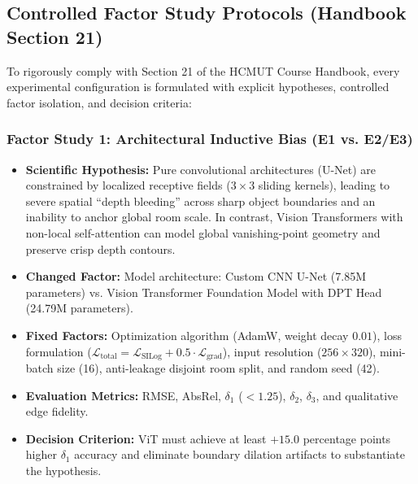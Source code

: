 \documentclass[twoside,final]{hcmut-report}
\begin{document}
\subsection{Controlled Factor Study Protocols (Handbook Section 21)}

To rigorously comply with Section 21 of the HCMUT Course Handbook, every experimental configuration is formulated with explicit hypotheses, controlled factor isolation, and decision criteria:

\subsubsection{Factor Study 1: Architectural Inductive Bias (E1 vs. E2/E3)}

\begin{itemize}[leftmargin=*]

  \item \textbf{Scientific Hypothesis:} Pure convolutional architectures (U-Net) are constrained by localized receptive fields ($3 \times 3$ sliding kernels), leading to severe spatial ``depth bleeding'' across sharp object boundaries and an inability to anchor global room scale. In contrast, Vision Transformers with non-local self-attention can model global vanishing-point geometry and preserve crisp depth contours.

  \item \textbf{Changed Factor:} Model architecture: Custom CNN U-Net (7.85M parameters) vs. Vision Transformer Foundation Model with DPT Head (24.79M parameters).

  \item \textbf{Fixed Factors:} Optimization algorithm (AdamW, weight decay $0.01$), loss formulation ($\mathcal{L}_{\text{total}} = \mathcal{L}_{\text{SILog}} + 0.5 \cdot \mathcal{L}_{\text{grad}}$), input resolution ($256 \times 320$), mini-batch size (16), anti-leakage disjoint room split, and random seed (42).

  \item \textbf{Evaluation Metrics:} RMSE, AbsRel, $\delta_1$ ($< 1.25$), $\delta_2$, $\delta_3$, and qualitative edge fidelity.

  \item \textbf{Decision Criterion:} ViT must achieve at least $+15.0$ percentage points higher $\delta_1$ accuracy and eliminate boundary dilation artifacts to substantiate the hypothesis.

\end{itemize}
\end{document}
